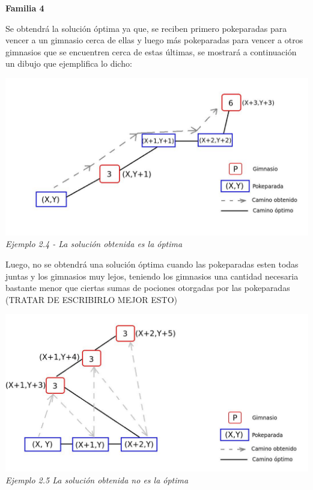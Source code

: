 \begin{center}
\textbf{Familia 4}
\end{center}

Se obtendr\'a la soluci\'on \'optima ya que, se reciben primero pokeparadas para vencer a un gimnasio cerca de ellas y luego m\'as pokeparadas para vencer a otros gimnasios que se encuentren cerca de estas \'ultimas, se mostrar\'a a continuaci\'on un dibujo que ejemplifica lo dicho:

\vspace*{0.3cm} \vspace*{0.3cm}
  \begin{center}
\includegraphics[scale=0.60]{./EJ2/optima.jpeg}
\\{\textit{Ejemplo 2.4 - La soluci\'on obtenida es la \'optima}}
  \end{center}
  \vspace*{0.3cm}

Luego, no se obtendr\'a una soluci\'on \'optima cuando las pokeparadas esten todas juntas y los gimnasios muy lejos, teniendo los gimnasios una cantidad necesaria bastante menor que ciertas sumas de pociones otorgadas por las pokeparadas (TRATAR DE ESCRIBIRLO MEJOR ESTO)

\vspace*{0.3cm} \vspace*{0.3cm}
  \begin{center}
\includegraphics[scale=0.60]{./EJ2/nooptima.jpeg}
\\{\textit{Ejemplo 2.5 La soluci\'on obtenida no es la \'optima}}
  \end{center}
  \vspace*{0.3cm}
  
